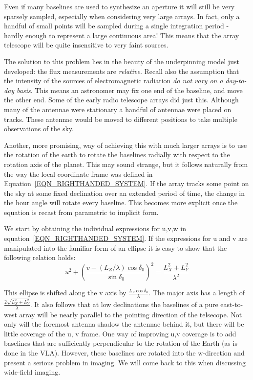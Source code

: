 Even if many baselines are used to synthesize an aperture it will still be
very sparsely sampled, especially when considering very large arrays. In fact, only a handful of small points will be 
sampled during a single integration period - hardly enough to represent a large continuous area! This means that 
the array telescope will be quite insensitive to very faint sources.

The solution to this problem lies in the beauty of the underpinning model just developed: the flux measurements
are \textit{relative}. Recall also the assumption that the intensity of the sources of electromagnetic radiation 
\textit{do not vary on a day-to-day basis}. This means an astronomer may fix one end of the baseline, and move the other
end. Some of the early radio telescope arrays did just this. Although many of the antennae were stationary a handful
of antennae were placed on tracks. These antennae would be moved to different positions to take multiple observations
of the sky.

Another, more promising, way of achieving this with much larger arrays is to use the rotation of the earth to rotate
the baselines radially with respect to the rotation axis of the planet. This may sound strange, but it 
follows naturally from the way the local coordinate frame was defined in Equation~\ref{EQN_RIGHTHANDED_SYSTEM}. If the
array tracks some point on the sky at some fixed declination over an extended period of time, the change in the hour
angle will rotate every baseline. This becomes more explicit once the equation is recast from parametric to implicit form. 

We start by obtaining the individual expressions for u,v,w in equation~\ref{EQN_RIGHTHANDED_SYSTEM}. If the expressions
for u and v are manipulated into the familiar form of an ellipse it is easy to show that the following
relation holds:
\begin{equation*}
 u^2 + \left(\frac{v-(L_Z/\lambda)\cos{\delta_0}}{\sin{\delta_0}}\right)^2 = \frac{L_X^2 + L_Y^2}{\lambda^2}
\end{equation*}

This ellipse is shifted along the v axis by $\frac{L_Z\cos{\delta_0}}{\lambda}$. The major axis has a length of 
$\frac{2\sqrt{L_X^2 + L_Y^2}}{\lambda}$. It also follows that at low declinations the baselines 
of a pure east-to-west array will be nearly parallel to the pointing direction of the telsecope.
Not only will the foremost antenna shadow the antennae behind it, but there will be little coverage of the u, v
frame. One way of improving u,v coverage is to add baselines that are sufficiently perpendicular to the 
rotation of the Earth (as is done in the VLA). However, these baselines are rotated into the w-direction 
and present a serious problem in imaging. We will come back to this when discussing wide-field imaging.

